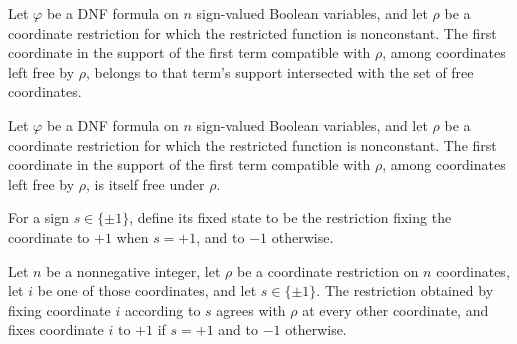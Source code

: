 \begin{theorem}
\label{FABL.DNFFormula.firstBadCoordinate_mem}
\leanok
{}
Let $\varphi$ be a DNF formula on $n$ sign-valued Boolean variables, and let $\rho$ be a
coordinate restriction for which the restricted function is nonconstant. The first
coordinate in the support of the first term compatible with $\rho$, among coordinates
left free by $\rho$, belongs to that term's support intersected with the set of free
coordinates.
\end{theorem}

\begin{theorem}
\label{FABL.DNFFormula.firstBadCoordinate_free}
\leanok
{}
Let $\varphi$ be a DNF formula on $n$ sign-valued Boolean variables, and let $\rho$ be a
coordinate restriction for which the restricted function is nonconstant. The first
coordinate in the support of the first term compatible with $\rho$, among coordinates
left free by $\rho$, is itself free under $\rho$.
\end{theorem}

\begin{definition}
\label{FABL.CoordRestriction.fixedState}
\leanok
{}
For a sign $s\in\{\pm1\}$, define its fixed state to be the restriction fixing the
coordinate to $+1$ when $s=+1$, and to $-1$ otherwise.
\end{definition}

\begin{definition}
\label{FABL.CoordRestriction.fixCoordinate}
\leanok
{}
Let $n$ be a nonnegative integer, let $\rho$ be a coordinate restriction on $n$
coordinates, let $i$ be one of those coordinates, and let $s\in\{\pm1\}$. The
restriction obtained by fixing coordinate $i$ according to $s$ agrees with $\rho$ at
every other coordinate, and fixes coordinate $i$ to $+1$ if $s=+1$ and to $-1$
otherwise.
\end{definition}

